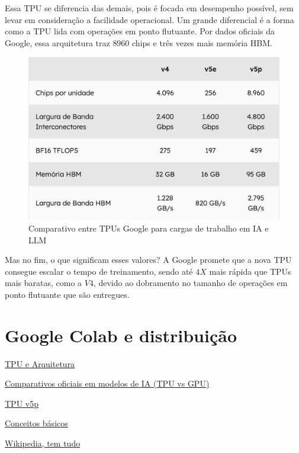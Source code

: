 \documentclass{report}
\begin{document}
Essa TPU se diferencia das demais, pois é focada em desempenho possível, sem levar em consideração a facilidade operacional. Um grande diferencial é a forma como a TPU lida com operações em ponto flutuante. Por dados oficiais da Google, essa arquitetura traz $8960$ chips e três vezes mais memória HBM.

\begin{figure}[h]
\includegraphics[scale=0.5]{comparativo-tpus}
\centering
\caption{Comparativo entre TPUs Google para cargas de trabalho em IA e LLM}
\end{figure}

Mas no fim, o que significam esses valores? A Google promete que a nova TPU consegue escalar o tempo de treinamento, sendo até $4X$ mais rápida que TPUs mais baratas, como a $V4$, devido ao dobramento no tamanho de operações em ponto flutuante que são entregues.

\chapter{Google Colab e distribuição}




\href{https://www.run.ai/guides/cloud-deep-learning/google-tpu}{TPU e Arquitetura}

\href{https://cloud.google.com/blog/products/compute/performance-per-dollar-of-gpus-and-tpus-for-ai-inference}{Comparativos oficiais em modelos de IA (TPU vs GPU)}

\href{https://canaltech.com.br/inteligencia-artificial/cloud-tpu-v5p-e-o-novo-e-mais-poderoso-acelerador-de-ia-do-google-272299/}{TPU v5p}

\href{https://cloud.google.com/tpu?hl=pt-BR}{Conceitos básicos}

\href{https://en.wikipedia.org/wiki/Tensor_Processing_Unit}{Wikipedia, tem tudo}
\end{document}
